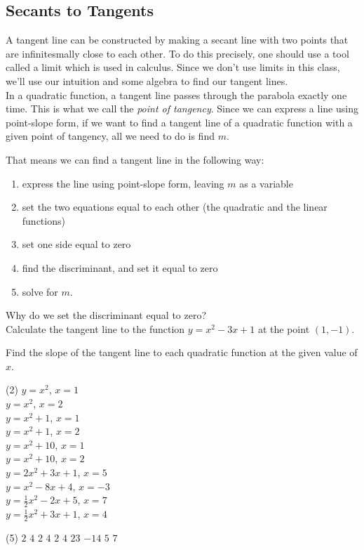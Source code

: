 \documentclass[12pt,fleqn]{book}
\newcommand{\prb}[1]{\begin{Exercise}#1\end{Exercise}}
\newcommand{\sol}[1]{\begin{Answer}#1\end{Answer}}
\begin{document}
\subsection*{Secants to Tangents}
A tangent line can be constructed by making a secant line with two points that are infinitesmally close to each other.  To do this precisely, one should use a tool called a limit which is used in calculus.  Since we don't use limits in this class, we'll use our intuition and some algebra to find our tangent lines.
\\[1em]
In a quadratic function, a tangent line passes through the parabola exactly one time.  This is what we call the \emph{point of tangency}.  Since we can express a line using point-slope form, if we want to find a tangent line of a quadratic function with a given point of tangency, all we need to do is find $m$.

That means we can find a tangent line in the following way:
\begin{enumerate}
	\item express the line using point-slope form, leaving $m$ as a variable
	\item set the two equations equal to each other (the quadratic and the linear functions)
	\item set one side equal to zero
	\item find the discriminant, and set it equal to zero
	\item solve for $m$.
\end{enumerate}
Why do we set the discriminant equal to zero?
\\[2in]
Calculate the tangent line to the function $y=x^2-3x+1$ at the point $(1,-1)$.
\clearpage
\prb{Find the slope of the tangent line to each quadratic function at the given value of $x$.
	\begin{tasks}(2)
		\task $y=x^2$, $x=1$ \\[10em]
		\task $y=x^2$, $x=2$ \\[10em]
		\task $y=x^2 + 1$, $x=1$ \\[10em]
		\task $y=x^2 + 1$, $x=2$ \\[10em]
		\task $y=x^2 + 10$, $x=1$ \\[10em]
		\task $y=x^2 + 10$, $x=2$ \\[10em]
		\task $y=2x^2 + 3x + 1$, $x=5$ \\[10em]
		\task $y=x^2 -8x + 4$, $x=-3$ \\[10em]
		\task $y=\frac 12 x^2 -2x + 5$, $x=7$ \\[10em]
		\task $y=\frac 12 x^2 +3x + 1$, $x=4$ \\[10em]
	\end{tasks}
}
\sol{
	\begin{tasks}(5)
		\task $2$
		\task $4$
		\task $2$
		\task $4$
		\task $2$
		\task $4$
		\task $23$
		\task $-14$
		\task $5$
		\task $7$
	\end{tasks}
}
\end{document}
